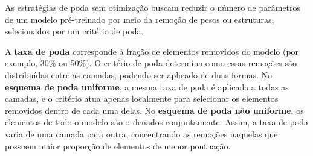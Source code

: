 As estratégias de poda sem otimização buscam reduzir o número de parâmetros de um modelo
pré-treinado por meio da remoção de pesos ou estruturas, selecionados por um critério de
poda.

A \textbf{taxa de poda} corresponde à fração de elementos removidos do modelo (por exemplo,
30\% ou 50\%). O critério de poda determina como essas remoções são distribuídas entre as
camadas, podendo ser aplicado de duas formas. No \textbf{esquema de poda uniforme}, a mesma
taxa de poda é aplicada a todas as camadas, e o critério atua apenas localmente para
selecionar os elementos removidos dentro de cada uma delas. No \textbf{esquema de poda não
uniforme}, os elementos de todo o modelo são ordenados conjuntamente. Assim, a taxa de poda
varia de uma camada para outra, concentrando as remoções naquelas que possuem maior
proporção de elementos de menor pontuação.

